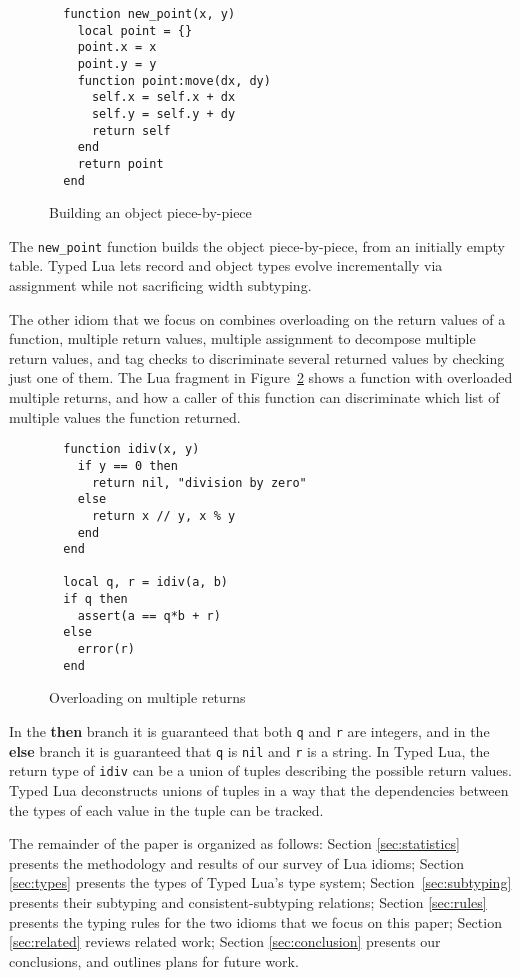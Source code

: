 \documentclass[preprint]{sigplanconf}
\begin{document}
\begin{figure}[t]
\begin{verbatim}
  function new_point(x, y)
    local point = {}
    point.x = x
    point.y = y
    function point:move(dx, dy)
      self.x = self.x + dx
      self.y = self.y + dy
      return self
    end
    return point
  end
\end{verbatim}
\caption{Building an object piece-by-piece}
\label{fig:newpoint}
\end{figure}

The {\tt new\_point} function builds the object piece-by-piece,
from an initially empty table. Typed Lua
lets record and object types evolve incrementally 
via assignment while not sacrificing width subtyping.

The other idiom that we focus on combines overloading on the return values of a function, multiple return values, multiple assignment
to decompose multiple return values,
and tag checks to discriminate several returned values
by checking just one of them. The Lua fragment in Figure~\ref{fig:over} shows a function with overloaded multiple
returns, and how a caller of this function can discriminate
which list of multiple values the function returned.

\begin{figure}[t]
\begin{verbatim}
  function idiv(x, y)
    if y == 0 then
      return nil, "division by zero"
    else
      return x // y, x % y
    end 
  end
  
  local q, r = idiv(a, b)
  if q then
    assert(a == q*b + r)
  else
    error(r)
  end
\end{verbatim}
\caption{Overloading on multiple returns}
\label{fig:over}
\end{figure}

In the {\bf then} branch it is guaranteed that both {\tt q}
and {\tt r} are integers, and in the {\bf else} branch it is
guaranteed that {\tt q} is {\tt nil} and {\tt r} is a string.
In Typed Lua, the return type of {\tt idiv} can be a union of
tuples describing the possible return values. Typed Lua deconstructs unions of tuples in a way that the dependencies between the types of each value in the tuple can be tracked.

The remainder of the paper is organized as follows:
Section \ref{sec:statistics} presents the methodology and results of
our survey of Lua idioms;
Section \ref{sec:types} presents the types of Typed Lua's
type system; Section~\ref{sec:subtyping} presents
their subtyping and consistent-subtyping relations;
Section \ref{sec:rules} presents the typing rules
for the two idioms that we focus on this paper;
Section \ref{sec:related} reviews related work;
Section \ref{sec:conclusion} presents our conclusions,
and outlines plans for future work.
\end{document}

